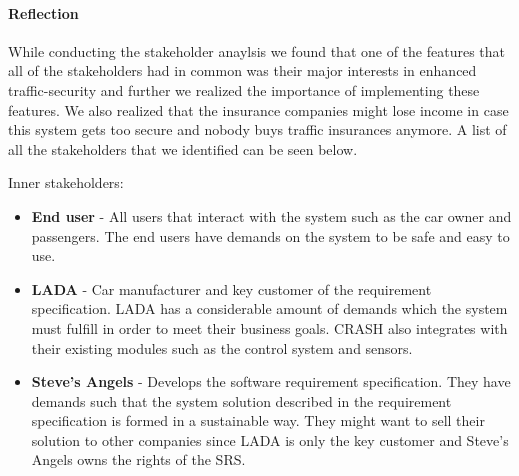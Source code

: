 \documentclass[10pt]{article}
\begin{document}
\paragraph{Reflection}
\hfill \break
While conducting the stakeholder anaylsis we found that one of the features that all of the stakeholders had in common was their major interests in enhanced traffic-security and further we realized the importance of implementing these features. We also realized that the insurance companies might lose income in case this system gets too secure and nobody buys traffic insurances anymore. A list of all the stakeholders that we identified can be seen below. 

\noindent Inner stakeholders:
\begin{itemize}
\item \textbf{End user} - All users that interact with the system such as the car owner and passengers. The end users have demands on the system to be safe and easy to use.
\item \textbf{LADA} - Car manufacturer and key customer of the requirement specification. LADA has a considerable amount of demands which the system must fulfill in order to meet their business goals. CRASH also integrates with their existing modules such as the control system and sensors.
\item \textbf{Steve's Angels} - Develops the software requirement specification. They have demands such that the system solution described in the requirement specification is formed in a sustainable way. They might want to sell their solution to other companies since LADA is only the key customer and Steve's Angels owns the rights of the SRS.
\end{itemize}
\end{document}
